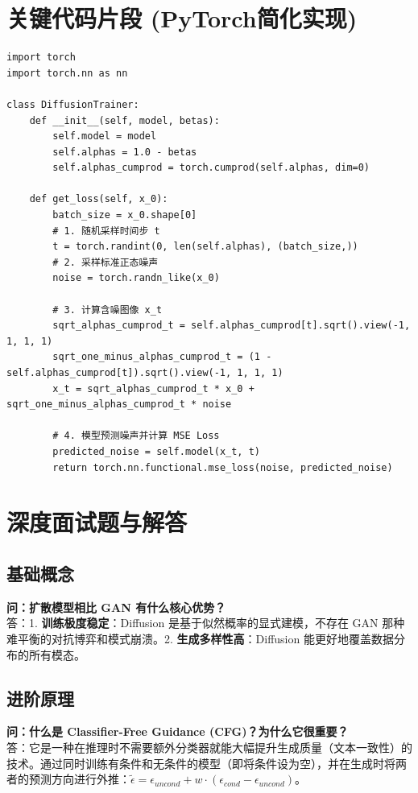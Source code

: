 \documentclass[12pt, a4paper]{book}
\begin{document}
\section{关键代码片段 (PyTorch简化实现)}
\begin{lstlisting}
import torch
import torch.nn as nn

class DiffusionTrainer:
    def __init__(self, model, betas):
        self.model = model
        self.alphas = 1.0 - betas
        self.alphas_cumprod = torch.cumprod(self.alphas, dim=0)

    def get_loss(self, x_0):
        batch_size = x_0.shape[0]
        # 1. 随机采样时间步 t
        t = torch.randint(0, len(self.alphas), (batch_size,))
        # 2. 采样标准正态噪声
        noise = torch.randn_like(x_0)
        
        # 3. 计算含噪图像 x_t
        sqrt_alphas_cumprod_t = self.alphas_cumprod[t].sqrt().view(-1, 1, 1, 1)
        sqrt_one_minus_alphas_cumprod_t = (1 - self.alphas_cumprod[t]).sqrt().view(-1, 1, 1, 1)
        x_t = sqrt_alphas_cumprod_t * x_0 + sqrt_one_minus_alphas_cumprod_t * noise
        
        # 4. 模型预测噪声并计算 MSE Loss
        predicted_noise = self.model(x_t, t)
        return torch.nn.functional.mse_loss(noise, predicted_noise)
\end{lstlisting}

\section{深度面试题与解答}
\subsection{基础概念}
\textbf{问：扩散模型相比 GAN 有什么核心优势？}\\
答：1. \textbf{训练极度稳定}：Diffusion 是基于似然概率的显式建模，不存在 GAN 那种难平衡的对抗博弈和模式崩溃。2. \textbf{生成多样性高}：Diffusion 能更好地覆盖数据分布的所有模态。

\subsection{进阶原理}
\textbf{问：什么是 Classifier-Free Guidance (CFG)？为什么它很重要？}\\
答：它是一种在推理时不需要额外分类器就能大幅提升生成质量（文本一致性）的技术。通过同时训练有条件和无条件的模型（即将条件设为空），并在生成时将两者的预测方向进行外推：$\tilde{\epsilon} = \epsilon_{uncond} + w \cdot (\epsilon_{cond} - \epsilon_{uncond})$。
\end{document}
